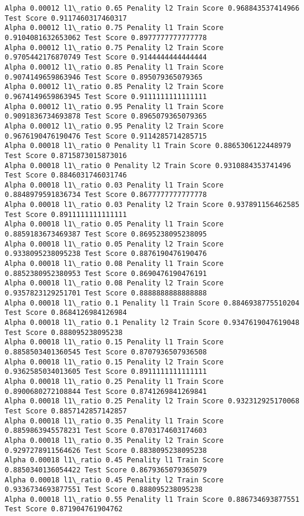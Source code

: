\documentclass[11pt]{article}
\begin{document}
\begin{Verbatim}[commandchars=\\\{\}]
Alpha 0.00012 l1\_ratio 0.65 Penality l2 Train Score 0.968843537414966 Test Score 0.9117460317460317
Alpha 0.00012 l1\_ratio 0.75 Penality l1 Train Score 0.9104081632653062 Test Score 0.8977777777777778
Alpha 0.00012 l1\_ratio 0.75 Penality l2 Train Score 0.9705442176870749 Test Score 0.9144444444444444
Alpha 0.00012 l1\_ratio 0.85 Penality l1 Train Score 0.9074149659863946 Test Score 0.895079365079365
Alpha 0.00012 l1\_ratio 0.85 Penality l2 Train Score 0.9674149659863945 Test Score 0.9111111111111111
Alpha 0.00012 l1\_ratio 0.95 Penality l1 Train Score 0.9091836734693878 Test Score 0.8965079365079365
Alpha 0.00012 l1\_ratio 0.95 Penality l2 Train Score 0.9676190476190476 Test Score 0.9114285714285715
Alpha 0.00018 l1\_ratio 0 Penality l1 Train Score 0.8865306122448979 Test Score 0.8715873015873016
Alpha 0.00018 l1\_ratio 0 Penality l2 Train Score 0.9310884353741496 Test Score 0.8846031746031746
Alpha 0.00018 l1\_ratio 0.03 Penality l1 Train Score 0.8848979591836734 Test Score 0.8677777777777778
Alpha 0.00018 l1\_ratio 0.03 Penality l2 Train Score 0.937891156462585 Test Score 0.8911111111111111
Alpha 0.00018 l1\_ratio 0.05 Penality l1 Train Score 0.8859183673469387 Test Score 0.8695238095238095
Alpha 0.00018 l1\_ratio 0.05 Penality l2 Train Score 0.9338095238095238 Test Score 0.8876190476190476
Alpha 0.00018 l1\_ratio 0.08 Penality l1 Train Score 0.8852380952380953 Test Score 0.8690476190476191
Alpha 0.00018 l1\_ratio 0.08 Penality l2 Train Score 0.9357823129251701 Test Score 0.8888888888888888
Alpha 0.00018 l1\_ratio 0.1 Penality l1 Train Score 0.8846938775510204 Test Score 0.8684126984126984
Alpha 0.00018 l1\_ratio 0.1 Penality l2 Train Score 0.9347619047619048 Test Score 0.888095238095238
Alpha 0.00018 l1\_ratio 0.15 Penality l1 Train Score 0.8858503401360545 Test Score 0.8707936507936508
Alpha 0.00018 l1\_ratio 0.15 Penality l2 Train Score 0.9362585034013605 Test Score 0.8911111111111111
Alpha 0.00018 l1\_ratio 0.25 Penality l1 Train Score 0.8900680272108844 Test Score 0.8741269841269841
Alpha 0.00018 l1\_ratio 0.25 Penality l2 Train Score 0.932312925170068 Test Score 0.8857142857142857
Alpha 0.00018 l1\_ratio 0.35 Penality l1 Train Score 0.8859863945578231 Test Score 0.8703174603174603
Alpha 0.00018 l1\_ratio 0.35 Penality l2 Train Score 0.9297278911564626 Test Score 0.8838095238095238
Alpha 0.00018 l1\_ratio 0.45 Penality l1 Train Score 0.8850340136054422 Test Score 0.8679365079365079
Alpha 0.00018 l1\_ratio 0.45 Penality l2 Train Score 0.9336734693877551 Test Score 0.888095238095238
Alpha 0.00018 l1\_ratio 0.55 Penality l1 Train Score 0.886734693877551 Test Score 0.871904761904762

\end{Verbatim}
\end{document}
